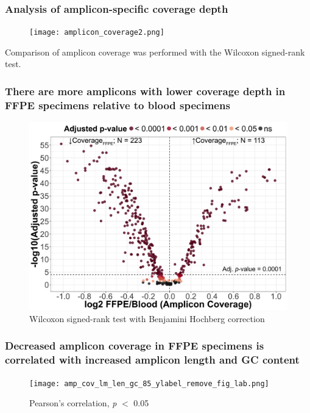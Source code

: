 \documentclass{beamer}
\begin{document}
\begin{frame}
\frametitle{Analysis of amplicon-specific coverage depth}
\begin{figure}[t]
    \texttt{[image: amplicon\_coverage2.png]}
\end{figure}
Comparison of amplicon coverage was performed with the Wilcoxon signed-rank test.
\end{frame}

\begin{frame}
\frametitle{There are more amplicons with lower coverage depth in FFPE specimens relative to blood specimens}
\begin{figure}[t]
    \includegraphics[scale=0.065]{amp_norm_depth_med_wilcoxon_volcano_85_xlabel.png}
    \caption{\scriptsize Wilcoxon signed-rank test with Benjamini Hochberg correction}
\end{figure}
\end{frame}

\begin{frame}
\frametitle{Decreased amplicon coverage in FFPE specimens is correlated with increased amplicon length and GC content}
\begin{figure}[t]
    \texttt{[image: amp\_cov\_lm\_len\_gc\_85\_ylabel\_remove\_fig\_lab.png]}
    \caption{\scriptsize Pearson's correlation, \textit{p} $<$ 0.05}
\end{figure}
\end{frame}
\end{document}
